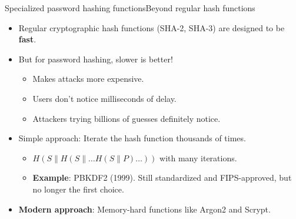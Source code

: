 \ifdefined\PRESENTATION\else\PassOptionsToClass{handout}{beamer}\fi\documentclass[aspectratio=169, lualatex]{beamer}
\begin{document}
\begin{frame}{Specialized password hashing functions}{Beyond regular hash functions}
	\begin{itemize}[<+->]
		\item Regular cryptographic hash functions (SHA-2, SHA-3) are designed to be \textbf{fast}.
		\item But for password hashing, slower is better!
		      \begin{itemize}
			      \item Makes attacks more expensive.
			      \item Users don't notice milliseconds of delay.
			      \item Attackers trying billions of guesses definitely notice.
		      \end{itemize}
		\item Simple approach: Iterate the hash function thousands of times.
		      \begin{itemize}
			      \item $H(S \| H(S \| \ldots H(S \| P)\ldots))$ with many iterations.
			      \item \textbf{Example}: PBKDF2 (1999). Still standardized and FIPS-approved, but no longer the first choice.
		      \end{itemize}
		\item \textbf{Modern approach}: Memory-hard functions like Argon2 and Scrypt.
	\end{itemize}
\end{frame}
\end{document}
